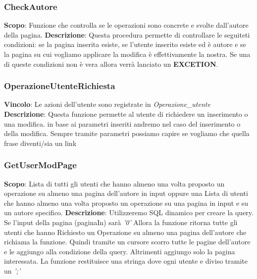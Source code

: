 \subsubsection{CheckAutore}
\textbf{Scopo}: Funzione che controlla se le operazioni sono concrete e svolte dall'autore della pagina.\newline\newline
\textbf{Descrizione}: Questa procedura permette di controllare le seguiteti condizioni: se la pagina inserita esiste, se l'utente inserito esiste ed è autore e se la pagina su cui vogliamo applicare la modifica è effettivamente la nostra. Se una di queste condizioni non è vera allora verrà lanciato un \textbf{EXCETION}.\newline


\newpage
\hypertarget{OperazioneUtenteRichiesta}{}
\subsubsection{OperazioneUtenteRichiesta}
\textbf{Vincolo}: Le azioni dell'utente sono registrate in \textit{Operazione\_utente} \newline\newline
\textbf{Descrizione}: Questa funzione permette al utente di richiedere un inserimento o una modifica. in base ai parametri inseriti andremo nel caso del inserimento o della modifica. Sempre tramite parametri possiamo capire se vogliamo che quella frase diventi/sia un link\newline


\newpage
\subsubsection{GetUserModPage}
\textbf{Scopo}: Lista di tutti gli utenti che hanno almeno una volta proposto un operazione su almeno una pagina dell'autore in input oppure una Lista di utenti che hanno almeno una volta proposto un operazione su una pagina in input e su un autore specifico. \newline\newline
\textbf{Descrizione}: Utilizzeremo SQL dinamico per creare la query. Se l'input della pagina (paginaIn) sarà \textit{'0'} Allora la funzione ritorna tutte gli utenti che hanno Richiesto un Operazione su almeno una pagina dell'autore che richiama la funzione. Quindi tramite un cursore scorro tutte le pagine dell'autore e le aggiungo alla condizione della query. Altrimenti aggiungo solo la pagina interessata. La funzione restituisce una stringa dove ogni utente e diviso tramite un \textit{';'}




